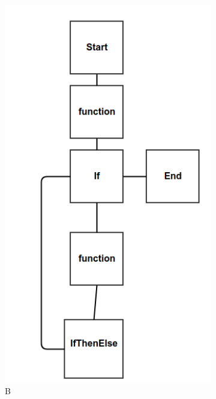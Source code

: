 \documentclass[14pt]{matmex-diploma}
\begin{document}
\begin{figure}
\begin{subfigure}[b]{0.4\textwidth}
        \includegraphics[width=\textwidth]{images/blockScheme2.png}
        \caption{B}
        \label{fig:B}
    \end{subfigure}
    ~ %
    \begin{subfigure}[b]{0.4\textwidth}

\end{subfigure}
\end{figure}
\end{document}
